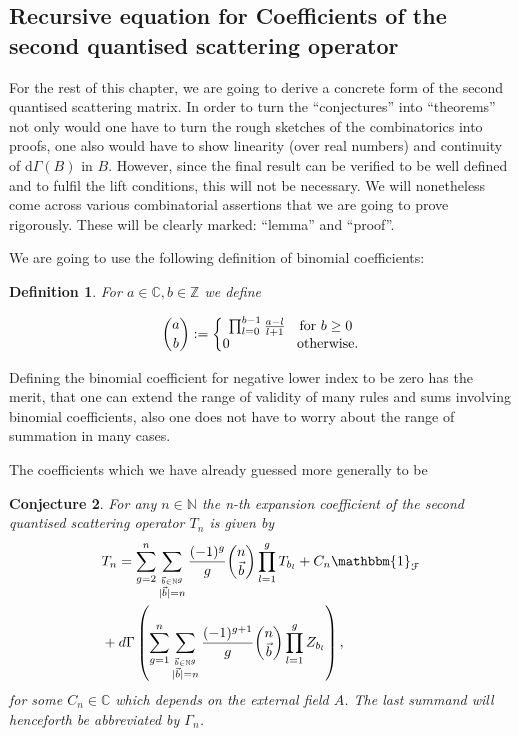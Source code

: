 \documentclass[b5paper,draft,openbib,12pt]{memoir}
\newtheorem{Def}{Definition}
\newtheorem{Conj}[Def]{Conjecture}
\newcommand{\id}{\mathbbm{1}}
\begin{document}
\subsection{Recursive equation for Coefficients of the second quantised scattering operator}

For the rest of this chapter, we are going to derive a concrete form of the second quantised scattering matrix. In order to turn the ``conjectures'' 
into ``theorems'' not only would one have to turn the rough sketches of the combinatorics into proofs, one also would have to show linearity (over real numbers) and
continuity of \(\mathrm{d}\Gamma(B)\) in \(B\).
However, since the final result can be verified to be well defined and to fulfil the lift conditions, this will not be necessary.
We will nonetheless come across various combinatorial assertions that we are going to prove rigorously. 
These will be clearly marked: ``lemma'' and ``proof''.

We are going to use the following definition of binomial coefficients:
\begin{Def}
For \(a\in\mathbb{C}, b\in\mathbb{Z}\) we define

\begin{equation}
\binom{a}{b} := \left\{\begin{matrix}
\prod_{l=0}^{b-1} \frac{a-l}{l+1} \quad \text{for } b\ge 0\\
0 \hspace{1.7cm} \text{otherwise.}
\end{matrix}\right.
\end{equation}
\end{Def}

Defining the binomial coefficient for negative lower index to be zero has the merit, that one can extend the
range of validity of many rules and sums involving binomial coefficients, also one does not have 
to worry about the range of summation in many cases.



The coefficients which we have already guessed more generally to be

\begin{Conj}\label{thm: T_n recursive}
For any \(n\in\mathbb{N}\) the n-th expansion coefficient of the second quantised scattering operator \(T_n\) is given by
\begin{align}\notag
&T_n = \sum_{g=2}^n \sum_{\stackrel{\vec{b}\in\mathbb{N}^g}{|\vec{b}|=n}}\frac{(-1)^g}{g} 
\binom{n}{\vec{b}} \prod_{l=1}^g T_{b_l} + C_n \id_{\mathcal{F}} \\ \label{T_n recursive}
&+ d\Gamma\left( \sum_{g=1}^n \sum_{\stackrel{\vec{b}\in\mathbb{N}^g}{|\vec{b}|=n}}\frac{(-1)^{g+1}}{g} 
\binom{n}{\vec{b}} \prod_{l=1}^g Z_{b_l}  \right),
\end{align}
for some \(C_n\in \mathbb{C}\) which depends on the external field \(A\). The last summand will henceforth
be abbreviated by \(\Gamma_n\).
\end{Conj}
\end{document}
